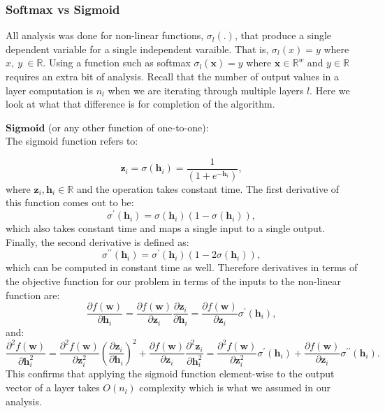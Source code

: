 \documentclass[letterpaper,12pt,titlepage,oneside,final]{book}
\begin{document}
	\subsubsection{Softmax vs Sigmoid}
	
	All analysis was done for non-linear functions, $\sigma_{l}(.)$, that produce a single dependent variable for a single independent varaible. That is, $\sigma_{l}(x) = y$ where $x, \ y \ \in \mathbb{R}$. Using a function such as softmax $\sigma_{l}(\mathbf{x}) = y$ where $\mathbf{x} \in \mathbb{R}^{w}$ and $y \in \mathbb{R}$ requires an extra bit of analysis. Recall that the number of output values in a layer computation is $n_{l}$ when we are iterating through multiple layers $l$. Here we look at what that difference is for completion of the algorithm. 
	
	$\mathbf{Sigmoid}$ (or any other function of one-to-one):\\
	The sigmoid function refers to:
	
	\begin{equation}
	\mathbf{z}_{i} = \sigma(\mathbf{h}_{i}) = \frac{1}{(1 + e^{-\mathbf{h}_{i}})}  ,
	\end{equation}
	where $\mathbf{z}_{i}, \mathbf{h}_{i} \in \mathbb{R}$ and the operation takes constant time. The first derivative of this function comes out to be:
	\begin{equation}
	\sigma^{\prime}(\mathbf{h}_{i}) = \sigma(\mathbf{h}_{i})(1-\sigma(\mathbf{h}_{i})),
	\end{equation}
	which also takes constant time and maps a single input to a single output. Finally, the second derivative is defined as:
	\begin{equation}
	\sigma^{\prime \prime}(\mathbf{h}_{i}) = \sigma^{\prime}(\mathbf{h}_{i})(1-2\sigma(\mathbf{h}_{i})),
	\end{equation}
	which can be computed in constant time as well. Therefore derivatives in terms of the objective function for our problem in terms of the inputs to the non-linear function are:
	\begin{equation}
	\frac{\partial{f(\mathbf{w})}}{\partial{\mathbf{h}_{i}}} = \frac{\partial{f(\mathbf{w})}}{\partial{\mathbf{z}_{i}}}\frac{\partial{\mathbf{z}_{i}}}{\partial{\mathbf{h}_{i}}} = \frac{\partial{f(\mathbf{w})}}{\partial{\mathbf{z}_{i}}}\sigma^{\prime}(\mathbf{h}_{i}),
	\end{equation}
	and:
	\begin{equation}
	\frac{\partial^{2}{f(\mathbf{w})}}{\partial{\mathbf{h}_{i}^{2}}} = \frac{\partial^{2}{f(\mathbf{w})}}{\partial{\mathbf{z}_{i}^{2}}}(\frac{\partial{\mathbf{z}_{i}}}{\partial{\mathbf{h}_{i}}})^{2} + \frac{\partial{f(\mathbf{w})}}{\partial{\mathbf{z}_{i}}}\frac{\partial^{2}{\mathbf{z}_{i}}}{\partial{\mathbf{h}_{i}^{2}}} = \frac{\partial^{2}{f(\mathbf{w})}}{\partial{\mathbf{z}_{i}^{2}}}\sigma^{\prime}(\mathbf{h}_{i}) + \frac{\partial{f(\mathbf{w})}}{\partial{\mathbf{z}_{i}}}\sigma^{\prime \prime}(\mathbf{h}_{i}).
	\end{equation}
	This confirms that applying the sigmoid function element-wise to the output vector of a layer takes $O(n_{l})$ complexity which is what we assumed in our analysis.
	
\end{document}
